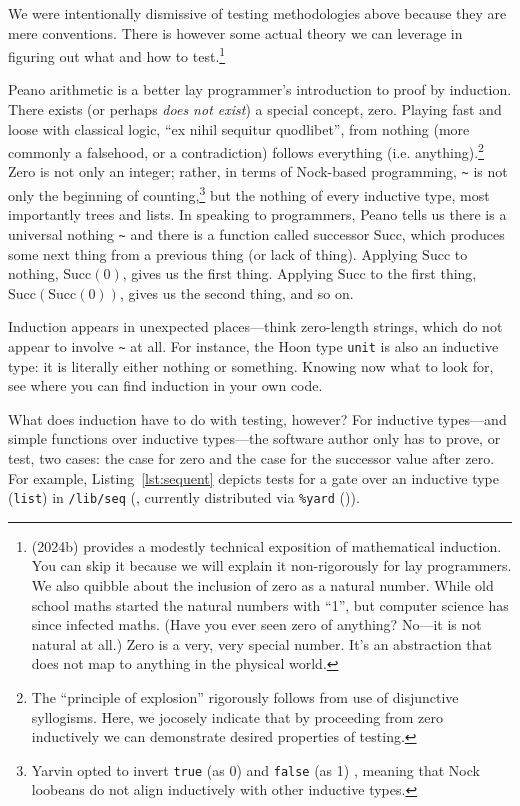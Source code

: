 \documentclass[twoside]{article}
\begin{document}
We were intentionally dismissive of testing methodologies a\-bove because they are mere conventions. There is however some actual theory we can leverage in figuring out what and how to test.\footnote{\citeauthor{WikipediaInduction} (2024b) provides a modestly technical exposition of mathematical induction. You can skip it because we will explain it non-rigorously for lay programmers.  We also quibble about the inclusion of zero as a natural number.  While old school maths started the natural numbers with “1”, but computer science has since infected maths. (Have you ever seen zero of anything?   No—it is not natural at all.)  Zero is a very, very special number.  It's an abstraction that does not map to anything in the physical world.}

Peano arithmetic is a better lay programmer's introduction to proof by induction. There exists (or perhaps \emph{does not exist}) a special concept, zero. Playing fast and loose with classical logic, “ex nihil sequitur quodlibet”, from nothing (more commonly a falsehood, or a contradiction) follows everything (i.e. anything).\footnote{The “principle of explosion” rigorously follows from use of disjunctive syllogisms.  Here, we jocosely indicate that by proceeding from zero inductively we can demonstrate desired properties of testing.} Zero is not only an integer; rather, in terms of Nock-based programming, \lstinline[style=inlinecode]{~} is not only the beginning of counting,\footnote{Yarvin opted to invert \texttt{true} (as 0) and \texttt{false} (as 1) \citep{Yarvin2006}, meaning that Nock loobeans do not align inductively with other inductive types.} but the nothing of every inductive type, most importantly trees and lists. In speaking to programmers, Peano tells us there is a universal nothing \lstinline[style=inlinecode]{~} and there is a function called successor $\textrm{Succ}$, which produces some next thing from a previous thing (or lack of thing). Applying $\textrm{Succ}$ to nothing, $\textrm{Succ}(0)$, gives us the first thing.  Applying $\textrm{Succ}$ to the first thing, $\textrm{Succ}(\textrm{Succ}(0))$, gives us the second thing, and so on.

Induction appears in unexpected places—think zero-length strings, which do not appear to involve \lstinline[style=inlinecode]{~} at all. For instance, the Hoon type \texttt{unit} is also an inductive type: it is literally either nothing or something. Knowing now what to look for, see where you can find induction in your own code.

What does induction have to do with testing, however?  For inductive types—and simple functions over inductive types—the software author only has to prove, or test, two cases:  the case for zero and the case for the successor value after zero.  For example, Listing~\ref{lst:sequent} depicts tests for a gate over an inductive type (\texttt{list}) in \texttt{/lib/seq} (, currently distributed via \texttt{\%yard} ()).
\end{document}

